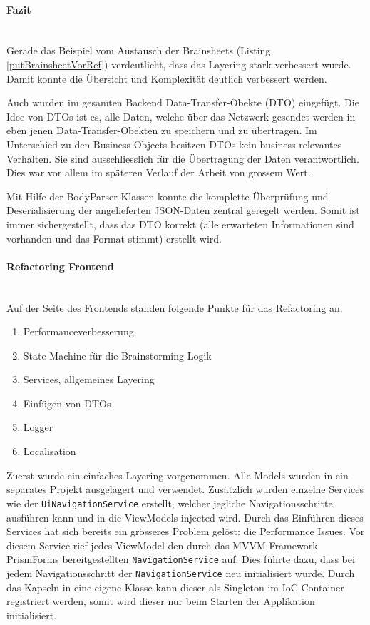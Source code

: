 \paragraph*{Fazit}~\\
Gerade das Beispiel vom Austausch der Brainsheets (Listing \ref{putBrainsheetVorRef}) verdeutlicht, dass das Layering stark verbessert wurde. Damit konnte die Übersicht und Komplexität deutlich verbessert werden.

Auch wurden im gesamten Backend Data-Transfer-Obekte (DTO) \cite{DTO} eingefügt. Die Idee von DTOs ist es, alle Daten, welche über das Netzwerk gesendet werden in eben jenen Data-Transfer-Obekten zu speichern und zu übertragen. Im Unterschied zu den Business-Objects besitzen DTOs kein business-relevantes Verhalten. Sie sind ausschliesslich für die Übertragung der Daten verantwortlich. Dies war vor allem im späteren Verlauf der Arbeit von grossem Wert.

Mit Hilfe der BodyParser-Klassen konnte die komplette Überprüfung und Deserialisierung der angelieferten JSON-Daten zentral geregelt werden. Somit ist immer sichergestellt, dass das DTO korrekt (alle erwarteten Informationen sind vorhanden und das Format stimmt) erstellt wird. 

\paragraph*{Refactoring Frontend}~\\
Auf der Seite des Frontends standen folgende Punkte für das Refactoring an:
\begin{enumerate}
	\item Performanceverbesserung
	\item State Machine für die Brainstorming Logik
	\item Services, allgemeines Layering
	\item Einfügen von DTOs
	\item Logger
	\item Localisation
\end{enumerate}

Zuerst wurde ein einfaches Layering vorgenommen. Alle Models wurden in ein separates Projekt ausgelagert und verwendet. Zusätzlich wurden einzelne Services wie der \texttt{UiNavigationService} erstellt, welcher jegliche Navigationsschritte ausführen kann und in die ViewModels injected wird. Durch das Einführen dieses Services hat sich bereits ein grösseres Problem gelöst: die Performance Issues. Vor diesem Service rief jedes ViewModel den durch das MVVM-Framework PrismForms bereitgestellten \texttt{NavigationService} auf. Dies führte dazu, dass bei jedem Navigationsschritt der \texttt{NavigationService} neu initialisiert wurde. Durch das Kapseln in eine eigene Klasse kann dieser als Singleton im IoC Container registriert werden, somit wird dieser nur beim Starten der Applikation initialisiert. 

